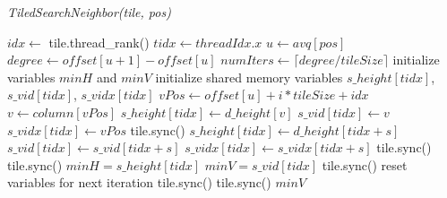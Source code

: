             \begin{algorithm}
                \caption{\textit{TiledSearchNeighbor(tile, pos)}}\label{alg:tiled-search}
                \begin{algorithmic}
                    \State $idx \gets $ tile.thread\_rank() 
                    \State $tidx \gets threadIdx.x$ 
                    \State $u \gets avq[pos]$ 
                    \State $degree \gets offset[u+1] - offset[u]$ 
                    \State $numIters \gets \lceil degree / tileSize \rceil $
                    \State initialize variables $minH$ and $minV $ 
                    \State initialize shared memory variables $s\_height[tidx]$, $s\_vid[tidx]$, $s\_vidx[tidx]$
                        \State $vPos \gets offset[u] + i*tileSize + idx$
                        \State $v \gets column[vPos]$    
                            \State $s\_height[tidx] \gets d\_height[v]$
                            \State $s\_vid[tidx] \gets v$
                            \State $s\_vidx[tidx] \gets vPos$
                        \EndIf
                        \State tile.sync()
                        \State {}
                                    \State $s\_height[tidx] \gets d\_height[tidx + s]$
                                    \State $s\_vid[tidx] \gets s\_vid[tidx + s]$
                                    \State $s\_vidx[tidx] \gets s\_vidx[tidx+ s]$    
                                \EndIf
                            \EndIf
                            \State tile.sync()
                        \EndFor
                        \State tile.sync()
                        \State {}
                                \State $minH = s\_height[tidx]$
                                \State $minV = s\_vid[tidx]$
                            \EndIf
                        \EndIf
                        \State tile.sync()
                        \State reset variables for next iteration
                        \State tile.sync()
                    \EndFor
                    \State tile.sync()
                    \State \Return $minV$
                \end{algorithmic}
            \end{algorithm}

